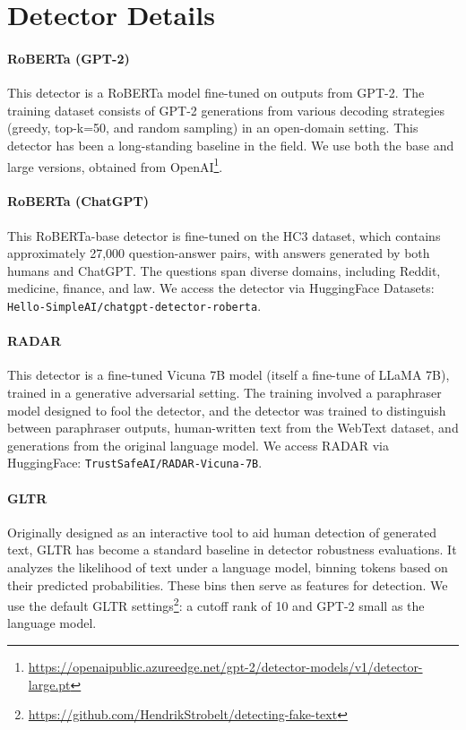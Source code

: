 \section{Detector Details}
\label{app:detectors}

\paragraph{RoBERTa (GPT-2)} \cite{solaiman-etal-2019} This detector is a RoBERTa model \cite{liu2019roberta} fine-tuned on outputs from GPT-2.  The training dataset consists of GPT-2 generations from various decoding strategies (greedy, top-k=50, and random sampling) in an open-domain setting.  This detector has been a long-standing baseline in the field. We use both the base and large versions, obtained from OpenAI\footnote{\url{https://openaipublic.azureedge.net/gpt-2/detector-models/v1/detector-large.pt}}.

\paragraph{RoBERTa (ChatGPT)} \cite{guo2023close} This RoBERTa-base \cite{liu2019roberta} detector is fine-tuned on the HC3 dataset, which contains approximately 27,000 question-answer pairs, with answers generated by both humans and ChatGPT.  The questions span diverse domains, including Reddit, medicine, finance, and law.  We access the detector via HuggingFace Datasets: \texttt{Hello-SimpleAI/chatgpt-detector-roberta}.

\paragraph{RADAR} \cite{hu2023radar} This detector is a fine-tuned Vicuna 7B model (itself a fine-tune of LLaMA 7B), trained in a generative adversarial setting.  The training involved a paraphraser model designed to fool the detector, and the detector was trained to distinguish between paraphraser outputs, human-written text from the WebText dataset, and generations from the original language model. We access RADAR via HuggingFace: \texttt{TrustSafeAI/RADAR-Vicuna-7B}.

\paragraph{GLTR} \cite{gehrmann-etal-2019-gltr} Originally designed as an interactive tool to aid human detection of generated text, GLTR has become a standard baseline in detector robustness evaluations.  It analyzes the likelihood of text under a language model, binning tokens based on their predicted probabilities. These bins then serve as features for detection. We use the default GLTR settings\footnote{\url{https://github.com/HendrikStrobelt/detecting-fake-text}}: a cutoff rank of 10 and GPT-2 small as the language model.

